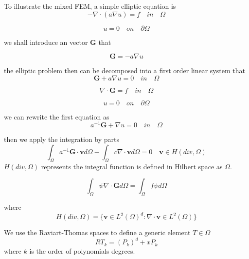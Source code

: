 To illustrate the mixed FEM, a simple elliptic equation is
\begin{equation}
- \nabla \cdot (a \nabla u) = f \quad in \quad \Omega
\end{equation}

\begin{equation}
u = 0 \quad on \quad \partial \Omega
\end{equation}

we shall introduce an vector $ \mathbf{G} $ that

\begin{equation}
\mathbf{G} = -a \nabla u
\end{equation}

the elliptic problem then can be decomposed into a first order linear system that
\begin{equation}
\mathbf{G} + a \nabla u = 0 \quad in \quad \Omega
\end{equation}

\begin{equation}
\nabla \cdot \mathbf{G} = f \quad in  \quad \Omega 
\end{equation}

\begin{equation}
u = 0 \quad  on  \quad \partial \Omega 
\end{equation}

we can rewrite the first equation as
\begin{equation}
a^{-1} \mathbf{G} + \nabla u = 0 \quad in \quad \Omega 
\end{equation}

then we apply the integration by parts
\begin{equation}
\int_{\Omega} a^{-1} \mathbf{G} \cdot \mathbf{v} d\Omega - \int_{\Omega} c \nabla \cdot \mathbf{v} d\Omega = 0 \quad \mathbf{v} \in H(div, \Omega)
\end{equation}
$ H(div, \Omega) $ represents the integral function is defined in Hilbert space as $ \Omega $.

\begin{equation}
\int_{\Omega} \psi \nabla \cdot \mathbf{G} d\Omega = \int_{\Omega} f \psi d\Omega 
\end{equation}

where 
\begin{equation}
H(div, \Omega) = \{\mathbf{v} \in L^{2}(\Omega)^{d} : \nabla \cdot \mathbf{v} \in L^{2}(\Omega) \}
\end{equation}

We use the Raviart-Thomas spaces to define a generic element $ T \in \Omega $
\begin{equation}
RT_{k} = (P_{k})^{d} + xP_{k}
\end{equation}
where $ k  $ is the order of polynomials degrees.

